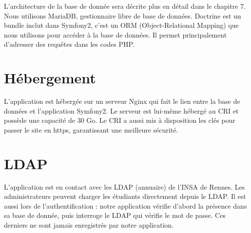 L'architecture de la base de donnée sera décrite plus en détail dans le chapitre 7. 
Nous utilisons MariaDB, gestionnaire libre de base de données.
\bigbreak
Doctrine est un bundle inclut dans Symfony2, c'est un ORM (Object-Relational Mapping) que nous utilisons pour accéder à la base de données. Il permet principalement d'adresser des requêtes dans les codes PHP.

\section{Hébergement}

L'application est hébergée sur un serveur Nginx qui fait le lien entre la base de données et l'application Symfony2. Le serveur est lui-même hébergé au CRI et possède une capacité de 30 Go. Le CRI a aussi mis à disposition les clés pour passer le site en https, garantissant une meilleure sécurité.

\section{LDAP}

L'application est en contact avec les LDAP (annuaire) de l'INSA de Rennes.
Les administrateurs peuvent charger les étudiants directement depuis le LDAP. Il est aussi lors de l'authentification : notre application vérifie d'abord la présence dans sa base de donnée, puis interroge le LDAP qui vérifie le mot de passe. Ces derniers ne sont jamais enregistrés par notre application. 